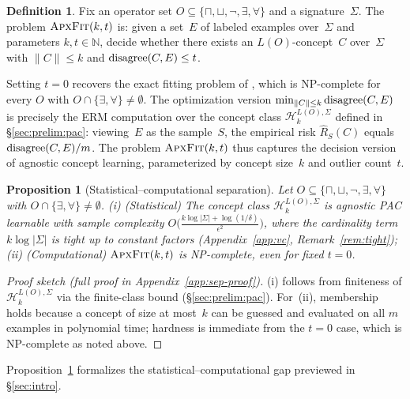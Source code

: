 \documentclass[accepted]{uai2026} %
\newtheorem{proposition}[theorem]{Proposition}
\theoremstyle{definition}
\newtheorem{definition}[theorem]{Definition}
\theoremstyle{remark}
\newcommand{\AF}{\textsc{ApxFit}}
\begin{document}
\begin{definition}\label{def:apxfit}
  Fix an operator set
  $O \subseteq \{\sqcap, \sqcup, \neg, \exists, \forall\}$ and a
  signature~$\Sigma$. The problem $\AF(k,t)$ is: given a set~$E$ of
  labeled examples over~$\Sigma$ and parameters
  $k, t \in \mathbb{N}$, decide whether there exists an
  $L(O)$-concept~$C$ over~$\Sigma$ with $\|C\| \leq k$ and
  $\textnormal{disagree}(C, E) \leq t$.
\end{definition}

Setting $t = 0$ recovers the exact fitting problem of
\citet{DBLP:conf/semweb/FunkJV25}, which is NP-complete for every
$O$ with $O \cap \{\exists, \forall\} \neq \emptyset$.
The optimization version
$\min_{\|C\| \leq k} \textnormal{disagree}(C, E)$ is precisely
the ERM computation over the concept class
$\mathcal{H}_{k}^{L(O),\Sigma}$ defined in
\S\ref{sec:prelim:pac}: viewing~$E$ as
the sample~$S$, the empirical risk $\hat{R}_S(C)$
equals $\textnormal{disagree}(C, E) / m$. The problem $\AF(k,t)$
thus captures the decision version of agnostic concept learning,
parameterized by concept size~$k$ and outlier count~$t$.

\begin{proposition}[Statistical--computational
separation]\label{prop:separation}
  Let $O \subseteq \{\sqcap, \sqcup, \neg, \exists, \forall\}$ with
  $O \cap \{\exists, \forall\} \neq \emptyset$. (i) \textnormal{(Statistical)} The concept class
      $\mathcal{H}_{k}^{L(O),\Sigma}$ is agnostic PAC learnable
      with sample complexity
      $O\bigl(\frac{k \log|\Sigma| + \log(1/\delta)}{\epsilon^2}\bigr)$,
      where the cardinality term $k \log|\Sigma|$ is tight up to
      constant factors
      (Appendix~\ref{app:vc}, Remark~\ref{rem:tight});
      (ii) \textnormal{(Computational)} $\AF(k,t)$ is
      \textnormal{NP}-complete, even for fixed $t = 0$.
\end{proposition}
\begin{proof}[Proof sketch
  (full proof in Appendix~\ref{app:sep-proof})]
  (i) follows from finiteness of
  $\mathcal{H}_{k}^{L(O),\Sigma}$ via the finite-class bound
  (\S\ref{sec:prelim:pac}). For~(ii), membership holds
  because a concept of size at most~$k$ can be guessed and
  evaluated on all $m$ examples in polynomial time; hardness is
  immediate from the $t = 0$ case, which is NP-complete as noted
  above.
\end{proof}

Proposition~\ref{prop:separation} formalizes
the statistical--computational gap previewed in
\S\ref{sec:intro}.
\end{document}
